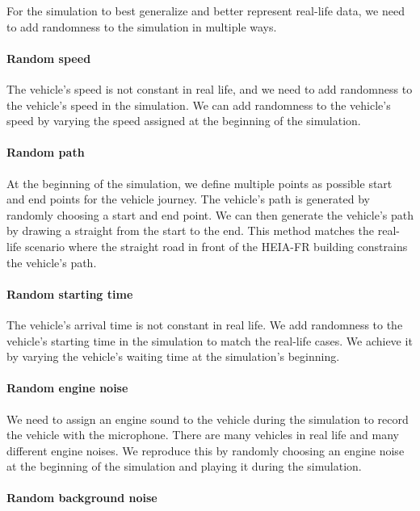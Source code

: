For the simulation to best generalize and better represent real-life data, we need to add randomness to the simulation in multiple ways. 

\paragraph{Random speed}

The vehicle's speed is not constant in real life, and we need to add randomness to the vehicle's speed in the simulation. We can add randomness to the vehicle's speed by varying the speed assigned at the beginning of the simulation. 

\paragraph{Random path}

At the beginning of the simulation, we define multiple points as possible start and end points for the vehicle journey. The vehicle's path is generated by randomly choosing a start and end point. We can then generate the vehicle's path by drawing a straight from the start to the end. This method matches the real-life scenario where the straight road in front of the HEIA-FR building constrains the vehicle's path. 

\paragraph{Random starting time}

The vehicle's arrival time is not constant in real life. We add randomness to the vehicle's starting time in the simulation to match the real-life cases. We achieve it by varying the vehicle's waiting time at the simulation's beginning.

\paragraph{Random engine noise}

We need to assign an engine sound to the vehicle during the simulation to record the vehicle with the microphone. There are many vehicles in real life and many different engine noises. We reproduce this by randomly choosing an engine noise at the beginning of the simulation and playing it during the simulation. 

\paragraph{Random background noise}

